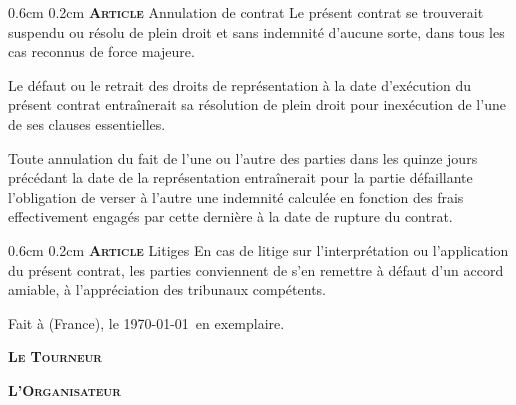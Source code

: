 \documentclass[a4paper,10pt,oneside]{article}
\makeatletter
\newcommand{\PR}{\textbf{\textsc{Le Tourneur}}}
\newcommand{\OR}{\textbf{\textsc{L'Organisateur}}}
\renewcommand\section{\@startsection{section}{1}{\z@}%
	{0.6cm}%
	{0.2cm}%
	{\noindent\large\bfseries\scshape Article }}
\renewcommand\subsection{\@startsection{subsection}{2}{1em}%
	{0.24cm}%
	{-0.5cm}%
	{\bfseries\scshape}}
\renewcommand\thesubsection{\thesection.\Roman{subsection})}
\makeatother
\begin{document}
\section{Annulation de contrat}
\label{sec:annulation}
Le pr\'esent contrat se trouverait suspendu ou r\'esolu de plein droit et
sans indemnit\'e d'aucune sorte, dans tous les cas reconnus de force
majeure.

Le d\'efaut ou le retrait des droits de repr\'esentation \`a la date
d'ex\'ecution du pr\'esent contrat entra\^inerait sa r\'esolution de plein
droit pour inex\'ecution de l'une de ses clauses essentielles.

Toute annulation du fait de l'une ou l'autre des parties dans les
quinze jours pr\'ec\'edant la date de la repr\'esentation entra\^inerait pour
la partie d\'efaillante l'obligation de verser \`a l'autre une indemnit\'e
calcul\'ee en fonction des frais effectivement engag\'es par cette
derni\`ere \`a la date de rupture du contrat.

\section{Litiges}
\label{sec:litiges}
En cas de litige sur l'interpr\'etation ou l'application du pr\'esent
contrat, les parties conviennent de s'en remettre \`a d\'efaut d'un accord
amiable, \`a l'appr\'eciation des tribunaux comp\'etents.

\vfill
Fait \`a \VILLEAMMD{} (France), le \today\ en \NBEX{} exemplaire.

\begin{minipage}[h!]{0.5\linewidth}
  \begin{center}
    \PR
  \end{center}
\end{minipage}
\begin{minipage}[h!]{0.5\linewidth}
  \begin{center}
    \OR
  \end{center}
\end{minipage}
\vspace{6cm}

\newpage
\appendix
\makeatletter
\renewcommand\section{\@startsection{section}{1}{\z@}%
	{1cm}%
	{0.2cm}%
	{\noindent\large\bfseries\scshape Annexe }}
\renewcommand\subsection{\@startsection{subsection}{2}{0.2em}%
	{0.24cm}%
	{0.1cm}%
	{\large\bfseries\scshape}}
\renewcommand\subsubsection{\@startsection{subsubsection}{3}{1em}%
	{0.24cm}%
	{-0.5cm}%
	{\bfseries\scshape}}
\makeatother
\renewcommand\thesubsection{\arabic{subsection}}
\end{document}
